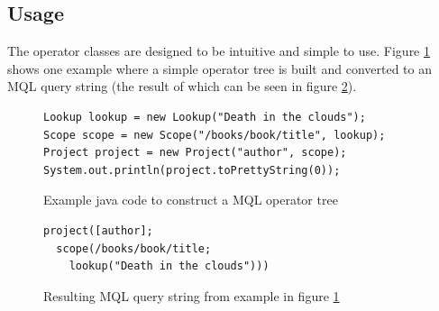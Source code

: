 \subsection{Usage}
The operator classes are designed to be intuitive and simple to use. Figure
\ref{fig:impl:mql_op_ex1_java} shows one example where a simple operator tree
is built and converted to an MQL query string (the result of which can be seen
in figure \ref{fig:impl:mql_op_ex1_mql}).

\begin{figure}[htp]
\begin{center}
  \begin{Verbatim}
Lookup lookup = new Lookup("Death in the clouds");
Scope scope = new Scope("/books/book/title", lookup);
Project project = new Project("author", scope);
System.out.println(project.toPrettyString(0));
  \end{Verbatim}
  \caption{Example java code to construct a MQL operator tree}
  \label{fig:impl:mql_op_ex1_java}
\end{center}
\end{figure}

\begin{figure}[htp]
\begin{center}
  \begin{Verbatim}
project([author];
  scope(/books/book/title;
    lookup("Death in the clouds")))
  \end{Verbatim}
  \caption{Resulting MQL query string from example in figure
  \ref{fig:impl:mql_op_ex1_java}}
  \label{fig:impl:mql_op_ex1_mql}
\end{center}
\end{figure}
